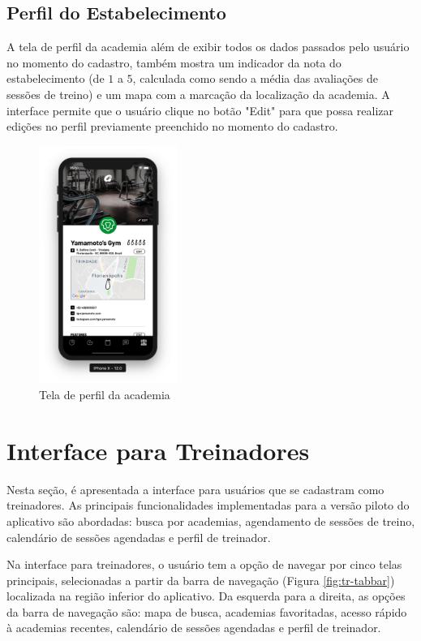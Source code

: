 \subsection{Perfil do Estabelecimento}
A tela de perfil da academia além de exibir todos os dados passados pelo usuário no momento do cadastro, também mostra um indicador da nota do estabelecimento (de $1$ a $5$, calculada como sendo a média das avaliações de sessões de treino) e um mapa com a marcação da localização da academia. A interface permite que o usuário clique no botão "Edit" para que possa realizar edições no perfil previamente preenchido no momento do cadastro.

\begin{figure}[H]
    \centering
    \includegraphics[width=0.4\textwidth]{pfc/figuras/gym-profile.png}
    \caption{Tela de perfil da academia}
    \label{fig:gym-profile}
\end{figure}

\section{Interface para Treinadores}
Nesta seção, é apresentada a interface para usuários que se cadastram como treinadores. As principais funcionalidades implementadas para a versão piloto do aplicativo são abordadas: busca por academias, agendamento de sessões de treino, calendário de sessões agendadas e perfil de treinador.  

Na interface para treinadores, o usuário tem a opção de navegar por cinco telas principais, selecionadas a partir da barra de navegação (Figura \ref{fig:tr-tabbar}) localizada na região inferior do aplicativo. Da esquerda para a direita, as opções da barra de navegação são: mapa de busca, academias favoritadas, acesso rápido à academias recentes, calendário de sessões agendadas e perfil de treinador.

